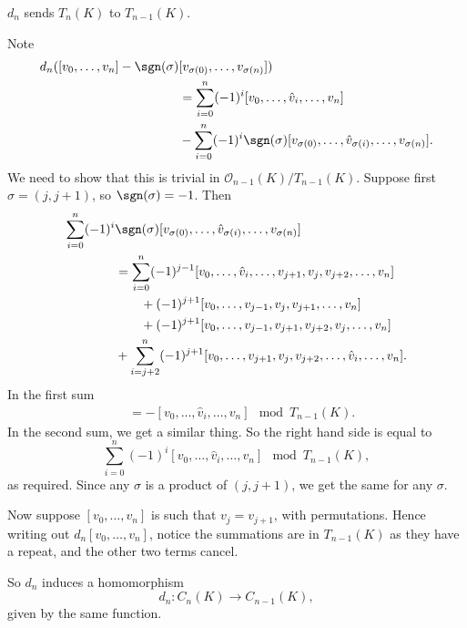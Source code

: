 \documentclass[12pt]{article}
\begin{document}
\begin{lemma}
	$d_n$ sends $T_n(K)$ to $T_{n-1}(K)$.
\end{lemma}

\begin{proofbox}
	Note
	\begin{align*}
		d_n([v_0, \ldots, v_n] - \sgn(\sigma) &[v_{\sigma(0)}, \ldots, v_{\sigma(n)}]) \\
		&= \sum_{i = 0}^n (-1)^{i}[v_0, \ldots, \hat v_i, \ldots, v_n] \\
											      &- \sum_{i = 0}^n (-1)^i \sgn(\sigma) [v_{\sigma(0)}, \ldots, \hat v_{\sigma(i)}, \ldots, v_{\sigma(n)}].
	\end{align*}
	We need to show that this is trivial in $\mathcal{O}_{n-1}(K) / T_{n-1}(K)$. Suppose first $\sigma=  (j, j+1)$, so $\sgn(\sigma) = -1$. Then
	\begin{align*}
		\sum_{i = 0}^n(-1)^i &\sgn(\sigma) [v_{\sigma(0)}, \ldots, \hat v_{\sigma(i)}, \ldots, v_{\sigma(n)}] \\
		&= \sum_{i = 0}^{n} (-1)^{j-1} [v_0, \ldots, \hat v_i, \ldots, v_{j+1}, v_j, v_{j+2}, \ldots, v_n] \\
														     & \qquad + (-1)^{j+1}[v_0, \ldots, v_{j-1}, v_{j}, v_{j+1}, \ldots, v_n] \\
														     &\qquad + (-1)^{j+1} [v_0, \ldots, v_{j-1}, v_{j+1}, v_{j+2}, v_j, \ldots, v_n] \\
														     &+ \sum_{i = j+2}^n (-1)^{j+1} [v_0, \ldots, v_{j+1}, v_j, v_{j+2}, \ldots, \hat v_i, \ldots, v_n].
	\end{align*}
	In the first sum
	\begin{align*}
		[v_0, \ldots, \hat v_i, \ldots, v_{j-1}, v_{j+1}, v_j, \ldots, v_{n}] &= - [v_0, \ldots, \hat v_i, \ldots, v_n] \mod T_{n-1}(K).
	\end{align*}
	In the second sum, we get a similar thing. So the right hand side is equal to
	\[
		\sum_{i = 0}^n(-1)^i [v_0, \ldots, \hat v_i, \ldots, v_n] \mod T_{n-1}(K),
	\]
	as required. Since any $\sigma$ is a product of $(j, j+1)$, we get the same for any $\sigma$.

	Now suppose $[v_0, \ldots, v_n]$ is such that $v_j = v_{j+1}$, with permutations. Hence writing out $d_{n}[v_0, \ldots, v_n]$, notice the summations are in $T_{n-1}(K)$ as they have a repeat, and the other two terms cancel.
\end{proofbox}

So $d_n$ induces a homomorphism
\[
d_n : C_n(K) \to C_{n-1}(K),
\]
given by the same function.
\end{document}
